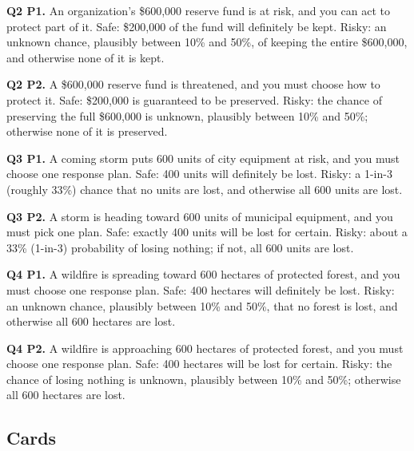 \documentclass[11pt]{article}
\begin{document}
\textbf{Q2 P1.} An organization's \$600,000 reserve fund is at risk, and you can act to protect part of it. Safe: \$200,000 of the fund will definitely be kept. Risky: an unknown chance, plausibly between 10\% and 50\%, of keeping the entire \$600,000, and otherwise none of it is kept.

\textbf{Q2 P2.} A \$600,000 reserve fund is threatened, and you must choose how to protect it. Safe: \$200,000 is guaranteed to be preserved. Risky: the chance of preserving the full \$600,000 is unknown, plausibly between 10\% and 50\%; otherwise none of it is preserved.

\textbf{Q3 P1.} A coming storm puts 600 units of city equipment at risk, and you must choose one response plan. Safe: 400 units will definitely be lost. Risky: a 1-in-3 (roughly 33\%) chance that no units are lost, and otherwise all 600 units are lost.

\textbf{Q3 P2.} A storm is heading toward 600 units of municipal equipment, and you must pick one plan. Safe: exactly 400 units will be lost for certain. Risky: about a 33\% (1-in-3) probability of losing nothing; if not, all 600 units are lost.

\textbf{Q4 P1.} A wildfire is spreading toward 600 hectares of protected forest, and you must choose one response plan. Safe: 400 hectares will definitely be lost. Risky: an unknown chance, plausibly between 10\% and 50\%, that no forest is lost, and otherwise all 600 hectares are lost.

\textbf{Q4 P2.} A wildfire is approaching 600 hectares of protected forest, and you must choose one response plan. Safe: 400 hectares will be lost for certain. Risky: the chance of losing nothing is unknown, plausibly between 10\% and 50\%; otherwise all 600 hectares are lost.

\subsection{Cards}
\end{document}
